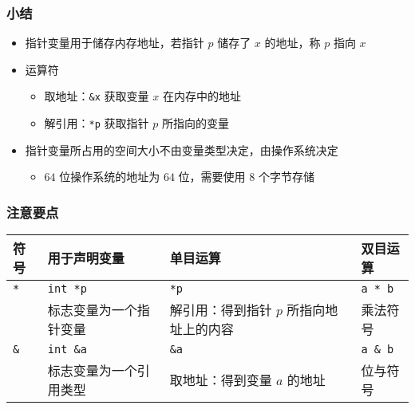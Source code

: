 \begin{frame}[fragile]
    \frametitle{小结}

    \begin{itemize}
        \item 指针变量用于储存内存地址，若指针 $p$ 储存了 $x$ 的地址，称 $p$ 指向 $x$

        \item 运算符
        \begin{itemize}
            \item 取地址：\lstinline|&x| 获取变量 $x$ 在内存中的地址
            \item 解引用：\lstinline|*p| 获取指针 $p$ 所指向的变量
        \end{itemize}

        \item 指针变量所占用的空间大小不由变量类型决定，由操作系统决定
        \begin{itemize}
            \item $64$ 位操作系统的地址为 $64$ 位，需要使用 $8$ 个字节存储
        \end{itemize}
    \end{itemize}
    
\end{frame}

\begin{frame}[fragile]
    \frametitle{注意要点}

    \begin{table}[!ht]
        \centering
        \renewcommand{\arraystretch}{1.5} %
        \begin{tabular}{p{0.8cm}p{3cm}p{3.6cm}p{1.6cm}}
            \hline
            \textbf{符号} & \textbf{用于声明变量}  & \textbf{单目运算}  & \textbf{双目运算} \\ \hline
            \lstinline|*| & \lstinline|int *p| & \lstinline|*p| & \lstinline|a * b| \\ 
            \lstinline| | & 标志变量为一个指针变量 & 解引用：得到指针 $p$ 所指向地址上的内容 &  乘法符号 \\ \hline
            \lstinline|&| & \lstinline|int &a| & \lstinline|&a| & \lstinline|a & b| \\ 
            \lstinline| | & 标志变量为一个引用类型 & 取地址：得到变量 $a$ 的地址 & 位与符号\\ \hline
        \end{tabular} 
    \end{table}

\end{frame}

